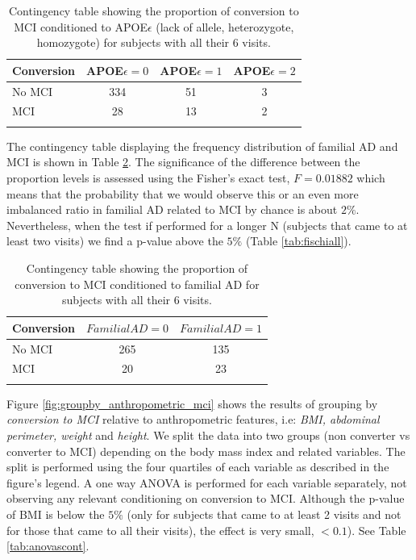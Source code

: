 \documentclass[11pt]{article}
\theoremstyle{definition}
\theoremstyle{remark}
\begin{document}
\begin{table}[!htb]
\centering
\caption{Contingency table showing the proportion of conversion to MCI conditioned to APOE$\epsilon$ (lack of allele, heterozygote, homozygote) for subjects with all their 6 visits.}
\begin{tabular}[t]{lccc}
\hline
Conversion&APOE$\epsilon=0$&APOE$\epsilon=1$&APOE$\epsilon=2$ \\
\hline
No MCI&334&51&3\\
MCI&28&13&2\\
\hline
\label{tab:apoemci}
\end{tabular}
\end{table}%

The contingency table displaying the frequency distribution of familial AD and MCI is shown in Table \ref{tab:famimci}. The significance of the difference between the proportion levels is assessed using the Fisher's exact test, $F = 0.01882$ which means that the probability that we would observe this or an even more imbalanced ratio in familial AD related to MCI by chance is about $2\%$. Nevertheless, when the test if performed for a longer N (subjects that came to at least two visits) we find a p-value above the $5\%$ (Table \ref{tab:fischiall}).

\begin{table}[!htb]
\centering
\caption{Contingency table showing the proportion of conversion to MCI conditioned to familial AD for subjects with all their 6 visits.}
\begin{tabular}[t]{lcc}
\hline
Conversion&{$FamilialAD=0$}&{$FamilialAD=1$} \\
\hline
No MCI&265&135\\
MCI&20&23\\
\hline
\label{tab:famimci}
\end{tabular}
\end{table}%

Figure \ref{fig:groupby_anthropometric_mci} shows the results of grouping by \emph{conversion to MCI} relative to anthropometric features, i.e: \emph{BMI, abdominal perimeter, weight} and \emph{height}. We split the data into two groups (non converter vs converter to MCI) depending on the body mass index and related variables. The split is performed using the four quartiles of each variable as described in the figure's legend.
A one way ANOVA is performed for each variable separately, not observing any relevant conditioning on conversion to MCI. Although the p-value of BMI is below the $5\%$ (only for subjects that came to at least 2 visits and not for those that came to all their visits), the effect is very small, $<0.1$). See Table \ref{tab:anovascont}.
\end{document}
